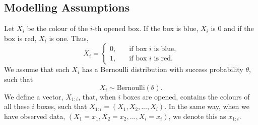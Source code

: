 \subsection{Modelling Assumptions}
\label{section_notation}
Let $X_i$ be the colour of the $i$-th opened box. If the box is blue, $X_i$ is 0 and if the box is red, $X_i$ is one. Thus,
\begin{equation*}
    X_i = \begin{cases}
    0,& \quad \text{if box } i \text{ is blue,}\\
    1,& \quad \text{if box } i \text{ is red.}
    \end{cases}
\end{equation*}
We assume that each $X_i$ has a Bernoulli distribution with success probability $\theta$, such that
\begin{equation*}
    X_i \sim \text{Bernoulli}(\theta).
\end{equation*}
We define a vector, $X_{1:i}$, that, when $i$ boxes are opened,
contains the colours of all these $i$ boxes, such that $X_{1:i} = (X_1,X_2,...,X_{i})$. In the same way, when we have observed data, $(X_1=x_1,X_2=x_2,...,X_i=x_i)$, we denote this as $x_{1:i}$.

